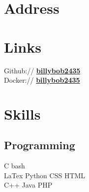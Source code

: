 \documentclass[letterpaper]{deedy-resume} %
\begin{document}
\begin{minipage}[t]{0.31\textwidth} %


\section{Address} 


\sectionspace %
\sectionspace %


\section{Links} 

Github:// \href{https://github.com/billybob2435}{\bf billybob2435} \\
Docker:// \href{https://hub.docker.com/u/billybob2435/}{\bf billybob2435} 

\sectionspace %




\section{Skills}

\subsection{Programming}

C \textbullet{} bash \\ 
LaTex \textbullet{} Python \textbullet{} CSS \textbullet{} HTML   \\
C++ \textbullet{} Java \textbullet{} PHP \\


\end{minipage}
\end{document}
